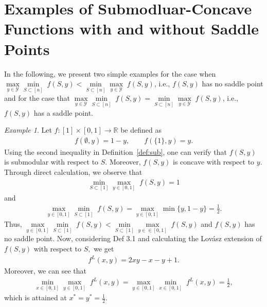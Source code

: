 \documentclass{article}
\theoremstyle{plain}
\theoremstyle{definition}
\theoremstyle{remark}
\newtheorem{example}[theorem]{Example}
\newcommand{\R}{\mathbb{R}}
\begin{document}
\section{Examples of Submodluar-Concave Functions with and without Saddle Points}\label{app:example}
In the following, we present two simple examples for the case when $\underset{y \in \mathcal{Y}}{\max}\underset{S \subset [n] }{\min}\;f(S,y)<\underset{S \subset [n] }{\min}\underset{y \in \mathcal{Y}}{\max}\;f(S,y)$, i.e., 
$f(S,y)$ has no saddle point and for the case that $\underset{y \in \mathcal{Y}}{\max}\underset{S \subset [n] }{\min}\;f(S,y)=\underset{S \subset [n] }{\min}\underset{y \in \mathcal{Y}}{\max}\;f(S,y)$, i.e.,
$f(S,y)$ has a saddle point. 
\begin{example}\label{ex:no_saddle}
Let $f:[1]\times [0,1] \rightarrow \R$ be defined as 
\begin{align*}
    f(\emptyset,y) = 1-y, \qquad f(\{1\},y)=y.
\end{align*}
Using the second inequality in Definition~\ref{def:sub}, one can verify that 
$f(S,y)$ is submodular with respect to $S.$ Moreover, $f(S,y)$ is concave with respect to $y.$  
Through direct calculation, we observe that
\begin{align*}
    \underset{S \subset [1] }{\min}\underset{y \in [0,1]}{\max}\;f(S,y) = 1
\end{align*}
and 
\begin{align*}
   \underset{y \in [0,1]}{\max} \underset{S \subset [1]}{\min}\;f(S,y) =  \underset{y \in [0,1]}{\max} \min\{y,1-y\} = \tfrac{1}{2}.
\end{align*}
Thus,
$\underset{y \in [0,1]}{\max}\underset{S \subset [1] }{\min}\;f(S,y)<\underset{S \subset [1] }{\min}\underset{y \in \in [0,1]}{\max}\;f(S,y)$
 and $f(S,y)$ has no saddle point. Now, considering \cite{bach2013learning} Def 3.1 and calculating the Lovász extension of $f(S,y)$ with respect to $S,$ we get 
 \begin{align*}
     f^L(x,y) = 2xy-x-y+1.
 \end{align*}
 Moreover, we can see that 
 \begin{align*}
     \underset{x \in [0,1]}{\min}\underset{y \in [0,1]}{\max}\;f^L(x,y)=\underset{y \in [0,1]}{\max}\underset{x \in [0,1]}{\min}\;f^L(x,y) = \tfrac{1}{2},
 \end{align*}
which is attained at $x^\ast=y^\ast=\frac{1}{2}.$
\end{example}
\end{document}
